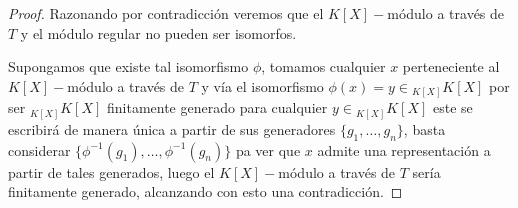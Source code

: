 \documentclass{article}
\newcommand{\K}{K[X]}
\begin{document}
\begin{proof}
    Razonando por contradicción veremos que el $K[X]-$módulo a través de $T$ y el módulo regular no pueden ser isomorfos. 

    Supongamos que existe tal isomorfismo $\phi$, 
    tomamos cualquier $x$ perteneciente al $K[X]-$módulo a través de $T$
    y vía el isomorfismo $\phi(x)= y \in {_{\K}}\K$
    por ser ${_{\K}}\K$ finitamente generado para cualquier 
    $y \in {_{\K}}\K$ este se escribirá de manera única a partir 
    de sus generadores $\{g_1, \ldots,g_n\}$, basta considerar
    $\{\phi^{-1}(g_1), \ldots, \phi^{-1}(g_n)\}$ pa ver que 
    $x$ admite una representación a partir de tales generados, luego el $K[X]-$módulo a través de $T$ sería finitamente generado, alcanzando con esto una contradicción.

\end{proof}
\end{document}
